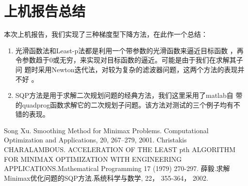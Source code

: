 \documentclass[a4paper,  11pt]{ctexart}
\begin{document}
\section{上机报告总结}
本次上机报告，我们实现了三种梯度型下降方法，在此作一个总结：
\begin{enumerate}
\item 光滑函数法和Least-p法都是利用一个带参数的光滑函数来逼近目标函数
  ，再令参数趋于0或无穷，来实现对目标函数的逼近。可能是由于我们在求解其子问
  题时采用Newton迭代法，对较为复杂的滤波器问题，这两个方法的表现并不好
  。
\item SQP方法是用于求解二次规划问题的经典方法，我们这里采用了matlab自
  带的quadprog函数求解它的二次规划子问题。该方法对测试的三个例子均有不
  错的表现。
\end{enumerate}
\renewcommand\refname{参考文献}
\begin{thebibliography}{99}
    Song Xu. Smoothing Method for Minimax Problems.
    Computational Optimization and Applications, 20, 267–279, 2001.
    Christakis CHARALAMBOUS. 
    ACCELERATION OF THE LEAST pth ALGORITHM
FOR MINIMAX OPTIMIZATION WITH ENGINEERING
APPLICATIONS.Mathematical Programming 17 (1979) 270-297. 
薛毅.求解Minimax优化问题的SQP方法.系统科学与数学, 22， 
  355-364， 2002.
\end{thebibliography}
\end{document}
